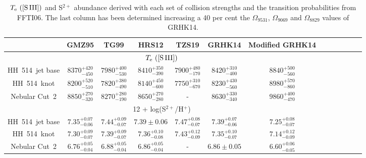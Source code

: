 \documentclass[fleqn,usenatbib]{mnras}
\begin{document}
\begin{table}
\centering
\caption{$T_{\rm e} \text{ ([S\thinspace III])}$ and S$^{2+}$ abundance derived with each set of collision strengths and the transition probabilities from FFTI06. The last column has been determined increasing a 40 per cent the  $\Omega_{9531}$, $\Omega_{9069}$ and $\Omega_{8829}$ values of GRHK14.}
\label{tab:modified_data_omega}
\begin{adjustbox}{width=\textwidth}
\begin{tabular}{ccccccccccccc}
\hline
 &  GMZ95 & TG99 & HRS12 &  TZS19 & GRHK14 & Modified GRHK14\\
\hline

\multicolumn{7}{c}{$T_{\rm e} \text{ ([S\thinspace III])}$} \\ 

HH~514~jet base  & $8370^{+420} _{-450}$ & $7980^{+400} _{-530}$ & $8410^{+350} _{-390}$ & $7900^{+480} _{-170}$ & $8420^{+310} _{-400}$ & $8840^{+500} _{-560}$ \\

HH~514~knot & $8200^{+520} _{-510}$ & $7820^{+380} _{-490}$ & $8140^{+450} _{-600}$& $7750^{+310} _{-670}$ & $8230^{+430} _{-560}$ & $8980^{+570} _{-860}$\\

Nebular Cut~2 & $8850^{+270} _{-320}$ & $8270^{+280} _{-190}$ & $8650^{+270} _{-280}$ & - & $8630^{+330} _{-340}$ & $9860^{+400} _{-470}$\\
\hline

\multicolumn{7}{c}{12 + log(S$^{2+}$/H$^{+}$)} \\

HH~514~jet base & $7.35^{+0.07} _{-0.06}$ & $7.44^{+0.09} _{-0.07}$&$7.39 \pm 0.06 $& $7.47^{+0.08} _{-0.07}$& $7.39^{+0.07} _{-0.06}$& $7.25^{+0.08} _{-0.07}$\\

HH~514~knot & $7.30^{+0.09} _{-0.07}$ & $7.39^{+0.09} _{-0.07}$& $7.36^{+0.10} _{-0.08}$& $7.43^{+0.12} _{-0.09}$ & $7.35^{+0.10} _{-0.07}$&  $7.14^{+0.12} _{-0.09}$\\

Nebular Cut~2 &$6.76^{+0.05} _{-0.04}$ &$6.88^{+0.05} _{-0.04}$ &$6.86^{+0.05} _{-0.04}$ & -& $6.86 \pm 0.05 $ & $6.60^{+0.06} _{-0.05}$ \\

\hline
\end{tabular}
\end{adjustbox}
\end{table}
\end{document}
